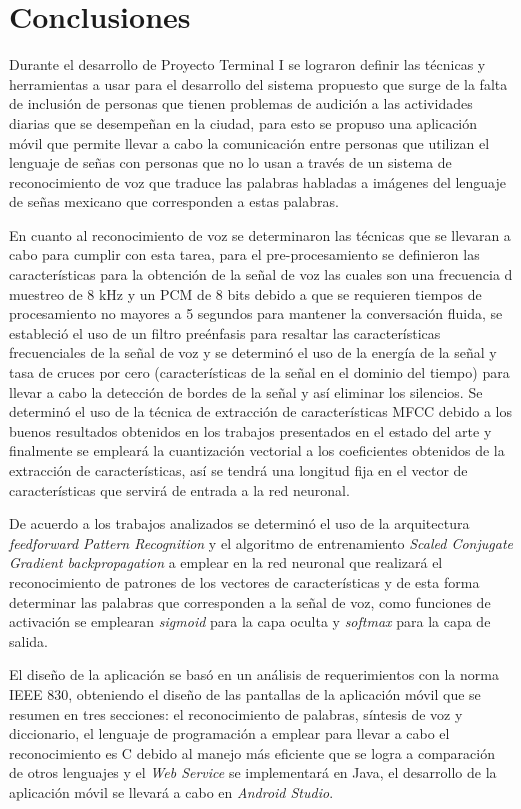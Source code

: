 
\section{Conclusiones}

Durante el desarrollo de Proyecto Terminal I se lograron definir las técnicas y herramientas a usar para el desarrollo del sistema propuesto que surge de la falta de inclusión de personas que tienen problemas de audición a las actividades diarias que se desempeñan en la ciudad, para esto se propuso una aplicación móvil que permite llevar a cabo la comunicación entre personas que utilizan el lenguaje de señas con personas que no lo usan a través de un sistema de reconocimiento de voz que traduce las palabras habladas a imágenes del lenguaje de señas mexicano que corresponden a estas palabras.

En cuanto al reconocimiento de voz se determinaron las técnicas que se llevaran a cabo para cumplir con esta tarea, para el pre-procesamiento se definieron las características para la obtención de la señal de voz las cuales son una frecuencia d muestreo de 8 kHz y un PCM de 8 bits debido a que se requieren tiempos de procesamiento no mayores a 5 segundos para mantener la conversación fluida, se estableció el uso de un filtro preénfasis para resaltar las características frecuenciales de la señal de voz y se determinó el uso de la energía de la señal y tasa de cruces por cero (características de la señal en el dominio del tiempo) para llevar a cabo la detección de bordes de la señal y así eliminar los silencios. Se determinó el uso de la técnica de extracción de características MFCC debido a los buenos resultados obtenidos en los trabajos presentados en el estado del arte y finalmente se empleará la cuantización vectorial a los coeficientes obtenidos de la extracción de características, así se tendrá una longitud fija en el vector de características que servirá de entrada a la red neuronal.

De acuerdo a los trabajos analizados se determinó el uso de la arquitectura \textit{feedforward Pattern Recognition} y el algoritmo de entrenamiento \textit{Scaled Conjugate Gradient backpropagation} a emplear en la red neuronal que realizará el reconocimiento de patrones de los vectores de características y de esta forma determinar las palabras que corresponden a la señal de voz, como funciones de activación se emplearan \textit{sigmoid} para la capa oculta y \textit{softmax} para la capa de salida.

El diseño de la aplicación se basó en un análisis de requerimientos con la norma IEEE 830, obteniendo el diseño de las pantallas de la aplicación móvil que se resumen en tres secciones: el reconocimiento de palabras, síntesis de voz y diccionario, el lenguaje de programación a emplear para llevar a cabo el reconocimiento es C debido al manejo más eficiente que se logra a comparación de otros lenguajes y el \textit{Web Service} se implementará en Java, el desarrollo de la aplicación móvil se llevará a cabo en \textit{Android Studio}.

